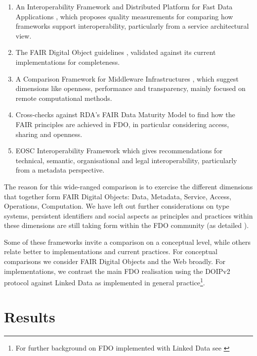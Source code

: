 \documentclass[fleqn,10pt,lineno]{wlpeerjlua}
\providecommand{\tightlist}{%
  \setlength{\itemsep}{0pt}\setlength{\parskip}{0pt}}
\begin{document}
\begin{enumerate}
\tightlist
\item
  An Interoperability Framework and Distributed Platform for Fast Data Applications \autocite{delgadoInteroperabilityFrameworkDistributed2016a}, which proposes quality measurements for comparing how frameworks support interoperability, particularly from a service architectural view.
\item
  The FAIR Digital Object guidelines \autocite{boninoFAIRDigitalObject}, validated against its current implementations for completeness.
\item
  A Comparison Framework for Middleware Infrastructures \autocite{zarrasComparisonFrameworkMiddleware2004a}, which suggest dimensions like openness, performance and transparency, mainly focused on remote computational methods.
\item
  Cross-checks against RDA's FAIR Data Maturity Model \autocite{bahimFAIRDataMaturity2020a} to find how the FAIR principles are achieved in FDO, in particular considering access, sharing and openness.
\item
  EOSC Interoperability Framework \autocite{corchoEOSCInteroperabilityFramework2021b} which gives recommendations for technical, semantic, organisational and legal interoperability, particularly from a metadata perspective.
\end{enumerate}

The reason for this wide-ranged comparison is to exercise the different dimensions that together form FAIR Digital Objects: Data, Metadata, Service, Access, Operations, Computation.
We have left out further considerations on type systems, persistent identifiers and social aspects as principles and practices within these dimensions are still taking form within the FDO community (as detailed ).

Some of these frameworks invite a comparison on a conceptual level, while others relate better to implementations and current practices. For conceptual comparisons we consider FAIR Digital Objects and the Web broadly. For implementations, we contrast the main FDO realisation using the DOIPv2 protocol \autocite{foundationDigitalObjectInterface} against Linked Data as implemented in general practice\footnote{For further background on FDO implemented with Linked Data see \autocite{FDOFramework,10.3897/rio.8.e94501}}.

\section*{Results}
\end{document}
